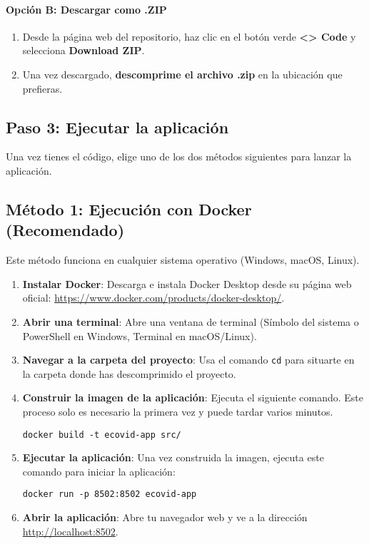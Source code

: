 \paragraph{Opción B: Descargar como .ZIP}
\begin{enumerate}
    \item Desde la página web del repositorio, haz clic en el botón verde \textbf{<> Code} y selecciona \textbf{Download ZIP}.
    \item Una vez descargado, \textbf{descomprime el archivo .zip} en la ubicación que prefieras.
\end{enumerate}

\subsection{Paso 3: Ejecutar la aplicación}
Una vez tienes el código, elige uno de los dos métodos siguientes para lanzar la aplicación.

\subsection{Método 1: Ejecución con Docker (Recomendado)}
Este método funciona en cualquier sistema operativo (Windows, macOS, Linux).
\begin{enumerate}
\item \textbf{Instalar Docker}: Descarga e instala Docker Desktop desde su página web oficial: \url{https://www.docker.com/products/docker-desktop/}.
\item \textbf{Abrir una terminal}: Abre una ventana de terminal (Símbolo del sistema o PowerShell en Windows, Terminal en macOS/Linux).
\item \textbf{Navegar a la carpeta del proyecto}: Usa el comando \texttt{cd} para situarte en la carpeta donde has descomprimido el proyecto.
\item \textbf{Construir la imagen de la aplicación}: Ejecuta el siguiente comando. Este proceso solo es necesario la primera vez y puede tardar varios minutos.
\begin{verbatim}
docker build -t ecovid-app src/
\end{verbatim}
\item \textbf{Ejecutar la aplicación}: Una vez construida la imagen, ejecuta este comando para iniciar la aplicación:
\begin{verbatim}
docker run -p 8502:8502 ecovid-app
\end{verbatim}
\item \textbf{Abrir la aplicación}: Abre tu navegador web y ve a la dirección \url{http://localhost:8502}.
\end{enumerate}

